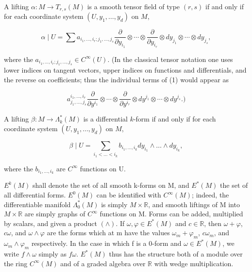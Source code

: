 \begin{remarks}\label{thm:2.16}
A lifting  $ \alpha\colon M \to T_{r,s}(M) $ is a smooth tensor field of type  $ (r,s) $ if and only if for each coordinate system  $ (U, y_1, \ldots, y_d) $ on  $ M $,

\begin{equation}
\tag{1}\label{eq:2.16:1}
\alpha\mid U=\sum a_{i_{1},\ldots,i_{r};j_{1},\ldots,j_{s}}\frac{\partial}{\partial y_{i_{1}}}\otimes\cdots\otimes\frac{\partial}{\partial y_{i_{r}}}\otimes d y_{j_{1}}\otimes\cdots\otimes d y_{j_{s}},
\end{equation}

where the  $ a_{i_1,\ldots,i_r;j_1,\ldots,j_s} \in C^\infty(U) $. (In the classical tensor notation one uses lower indices on tangent vectors, upper indices on functions and differentials, and the reverse on coefficients; thus the individual terms of (1) would appear as

\[
a_{j_{1},\ldots,j_{s}}^{i_{1},\ldots,i_{r}}\frac{\partial}{\partial y^{i_{1}}}\otimes\cdots\otimes\frac{\partial}{\partial y^{i_{r}}}\otimes d y^{j_{1}}\otimes\cdots\otimes d y^{j_{s}}.)\nonumber
\]

A lifting $\beta\colon M\to\Lambda_{k}^{*}(M)$ is a differential $k$-form if and only if for each coordinate system $(U,y_{1},\ldots,y_{d})$ on $M$,

\begin{equation}
\tag{2}\label{eq:2.16:2}
\beta\mid U=\sum_{i_{1}<\dots<i_{k}}b_{i_{1},\dots,i_{k}}d y_{i_{1}}\wedge\dots\wedge d y_{i_{k}},
\end{equation}

where the  $ b_{i_{1},...,i_{k}} $ are  $ C^{\infty} $ functions on U.

\end{remarks}

\begin{definition}\label{thm:2.17}
$ E^k(M) $ shall denote the set of all smooth k-forms on M, and  $ E^*(M) $ the set of all differential forms.  $ E^0(M) $ can be identified with  $ C^\infty(M) $; indeed, the differentiable manifold  $ \Lambda_0^*(M) $ is simply  $ M \times \mathbb{R} $, and smooth liftings of M into  $ M \times \mathbb{R} $ are simply graphs of  $ C^\infty $ functions on M. Forms can be added, multiplied by scalars, and given a product  $ (\wedge) $. If  $ \omega, \varphi \in E^*(M) $ and  $ c \in \mathbb{R} $, then  $ \omega + \varphi $,  $ c\omega $, and  $ \omega \wedge \varphi $ are the forms which at m have the values  $ \omega_m + \varphi_m $,  $ c\omega_m $, and  $ \omega_m \wedge \varphi_m $ respectively. In the case in which f is a 0-form and  $ \omega \in E^*(M) $, we write  $ f \wedge \omega $ simply as  $ f\omega $.  $ E^*(M) $ thus has the structure both of a module over the ring  $ C^\infty(M) $ and of a graded algebra over  $ \mathbb{R} $ with wedge multiplication.

\end{definition}


